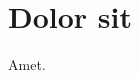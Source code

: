 \documentclass[main.tex]{subfiles}
\begin{document}
\section{Dolor sit}

Amet\cite{DolorSitAmet2001}.
\end{document}
